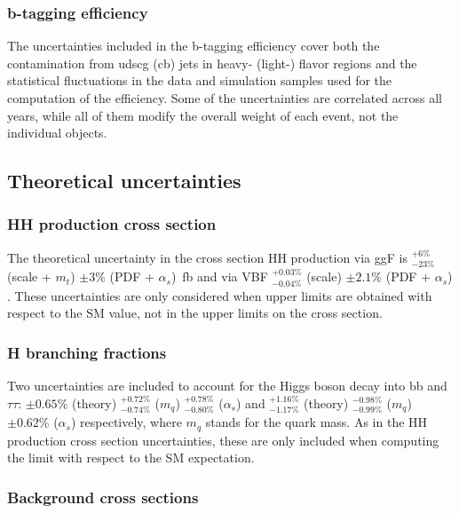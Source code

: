 \documentclass[../main.tex]{subfiles}
\begin{document}
\subsubsection*{b-tagging efficiency}

The uncertainties included in the b-tagging efficiency cover both the contamination from udscg (cb) jets in heavy- (light-) flavor regions and the statistical fluctuations in the data and simulation samples used for the computation of the efficiency. Some of the uncertainties are correlated across all years, while all of them modify the overall weight of each event, not the individual objects.


\subsection*{Theoretical uncertainties}

\subsubsection*{HH production cross section}

The theoretical uncertainty in the cross section HH production via ggF is ${}^{+6\%}_{-23\%}$ (scale + $m_t$) $\pm 3\%$ (PDF + $\alpha_s$)~fb \cite{hh:results:ggf_xs} and via VBF ${}^{+0.03\%}_{-0.04\%}$ (scale) $\pm 2.1\%$ (PDF + $\alpha_s$) \cite{hh:results:vbf_xs}. These uncertainties are only considered when upper limits are obtained with respect to the SM value, not in the upper limits on the cross section.

\subsubsection*{H branching fractions}

Two uncertainties are included to account for the Higgs boson decay \cite{hh:results:h_bf} into bb and $\tau\tau$: $\pm 0.65\%$ (theory) ${}^{+0.72\%}_{-0.74\%}$ ($m_q$) ${}^{+0.78\%}_{-0.80\%}$ ($\alpha_s$) and 
${}^{+1.16\%}_{-1.17\%}$  (theory) ${}^{-0.98\%}_{-0.99\%}$ ($m_q$) $\pm 0.62\%$ ($\alpha_s$) respectively, where $m_q$ stands for the quark mass. As in the HH production cross section uncertainties, these are only included when computing the limit with respect to the SM expectation.

\subsubsection*{Background cross sections}
\end{document}
